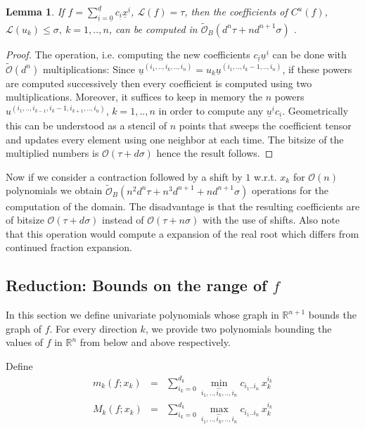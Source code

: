\documentclass{sig-alternate}
\newtheorem{lemma}[theorem]{Lemma}
\newcommand{\dott}{{..}}
\def\RR{\mathbb{R}}
\newcommand{\OO}{\ensuremath{\mathcal{O}}\xspace}
\newcommand{\sO}{\ensuremath{\widetilde{\mathcal{O}}}\xspace}
\newcommand{\sOB}{\ensuremath{\widetilde{\mathcal{O}}_B}\xspace}
\newcommand{\uvec}[1]{\underline{#1}}
\begin{document}
\begin{lemma} \label{contractComplexity} If $f=\sum_{\uvec i=\uvec
    0}^{\uvec d} c_{\uvec i} \uvec x^{\uvec i}$, $\mathcal L(f)=\tau$,
  then the coefficients of $C^u(f)$, $\mathcal L(u_k)\leq\sigma,\
  k=1,\dott,n$, can be computed in $  \sOB(  d^n\tau + nd^{n+1}\sigma) $ .
\end{lemma}
\begin{proof}
  The operation, i.e. computing the new coefficients $c_{\uvec i}
  \uvec u^{\uvec i}$ can be done with $\sO(d^n)$ multiplications: Since
  $\uvec u^{(i_1,\dott,i_k,\dott,i_n)}= u_k \uvec u^{(i_1,\dott,i_k-1,\dott,i_n)}$, 
  if these powers are computed
  successively then every coefficient is computed using two
  multiplications. Moreover, it suffices to keep in memory the $n$
  powers $u^{(i_1,\dott,i_{k-1},i_k-1,i_{k+1},\dott,i_n)}$,
  $k=1,\dott,n$ in order to compute any $\uvec u^{\uvec i} c_{\uvec
    i}$. Geometrically this can be understood as a stencil of $n$
  points that sweeps the coefficient tensor and updates every element
  using one neighbor at each time. The bitsize of the multiplied
  numbers is $\OO(\tau+d\sigma)$ hence the result follows.
\end{proof}

Now if we consider a contraction followed by a shift by $1$
w.r.t. $x_k$ for $\OO(n)$ polynomials we obtain $ \sOB(n^2d^n\tau +
n^3d^{n+1} + nd^{n+1}\sigma) $ operations for the computation of the
domain. The disadvantage is that the resulting coefficients are of
bitsize $\OO(\tau+d\sigma)$ instead of $\OO(\tau+n\sigma)$ with the
use of shifts. Also note that this operation would compute a expansion
of the real root which differs from  continued fraction expansion.



\subsection{Reduction: Bounds on the range of {$f$}}  \label{subsec:reduction}

In this section we define univariate polynomials whose graph in
$\RR^{n+1}$ bounds the graph of $f$. For every direction $k$, we provide
two polynomials bounding the values of $f$ in $\RR^n$ from
below and above respectively.

Define
\begin{eqnarray}
  m_k (f ; x_k) & = & \sum_{i_k = 0}^{d_k}
  \min_{i_1,..,\widehat{i_k},.., i_n } c_{i_1 \dott i_n} \, x_k^{i_k} \\ 
  M_k (f ; x_k) & = & \sum_{i_k = 0}^{d_k}
  \max_{i_1,..,\widehat{i_k},.., i_n } c_{i_1 \dott i_n} \, x_k^{i_k}
\end{eqnarray}
\end{document}
